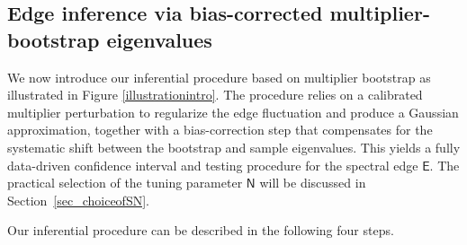 \documentclass[12pt]{article}
\def\sN{\mathsf N}
\theoremstyle{plain}
\numberwithin{equation}{section}
\begin{document}
\subsection{Edge inference via bias-corrected multiplier-bootstrap eigenvalues}\label{sec_algorithm}

We now introduce our inferential procedure based on multiplier bootstrap as illustrated in Figure \ref{illustrationintro}. The procedure relies on a calibrated multiplier perturbation to regularize the edge fluctuation and produce a Gaussian approximation, together with a bias-correction step that compensates for the systematic shift between the bootstrap and sample eigenvalues. This yields a fully data-driven confidence interval and testing procedure for the spectral edge $\mathsf{E}$. The practical selection of the tuning parameter $\sN$ will be discussed in Section~\ref{sec_choiceofSN}. 

Our inferential procedure can be described in the following four steps. 
\end{document}
